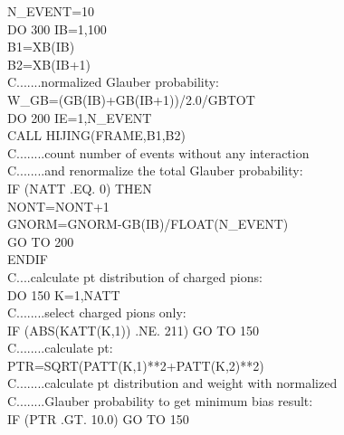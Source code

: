 {\begin{tabbing}
\>\>    N\_EVENT=10 \\
\>\>    DO 300 IB=1,100 \\
\>\>    \hspace{24pt}B1=XB(IB) \\
\>\>    \hspace{24pt}B2=XB(IB+1)\\
C.......\>\>normalized Glauber probability:\\
\>\>    \hspace{24pt}W\_GB=(GB(IB)+GB(IB+1))/2.0/GBTOT\\
\>\>    \hspace{24pt}DO 200 IE=1,N\_EVENT\\
\>\>    \hspace{48pt}CALL HIJING(FRAME,B1,B2) \\
C........\>\>count number of events without any interaction\\
C........\>\>and renormalize the total Glauber probability:\\
\>\>    \hspace{48pt}IF (NATT .EQ. 0) THEN \\
\>\>    \hspace{62pt}NONT=NONT+1 \\
\>\>    \hspace{62pt}GNORM=GNORM-GB(IB)/FLOAT(N\_EVENT) \\
\>\>    \hspace{62pt}GO TO 200\\
\>\>    \hspace{48pt}ENDIF \\
C....calculate pt distribution of charged pions: \>\> \\
\>\>    \hspace{48pt}DO 150 K=1,NATT \\
C........\>\>select charged pions only: \\
\>\>    \hspace{62pt}IF (ABS(KATT(K,1)) .NE. 211) GO TO 150 \\
C........\>\>calculate pt: \\
\>\>    \hspace{62pt}PTR=SQRT(PATT(K,1)**2+PATT(K,2)**2) \\
C........\>\>calculate pt distribution and weight with normalized\\
C........\>\>Glauber probability to get minimum bias result:\\
\>\>    \hspace{62pt}IF (PTR .GT. 10.0) GO TO 150 \\

\end{tabbing}}
